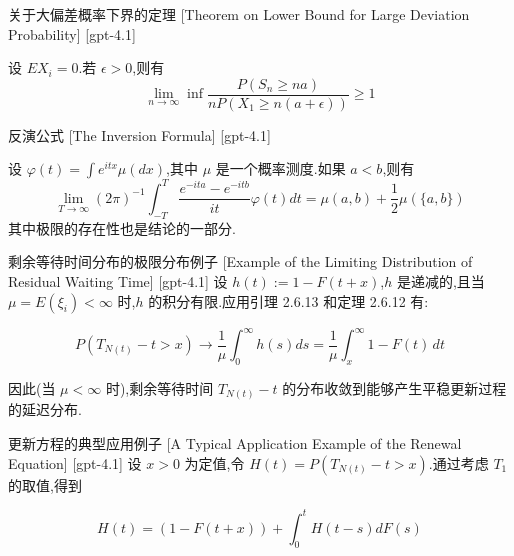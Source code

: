 \documentclass[UTF8]{ctexart}
\begin{document}
    
    
    \begin{thm}
        {关于大偏差概率下界的定理}
        [Theorem on Lower Bound for Large Deviation Probability]
        [gpt-4.1]
        
设 $E X_{i} = 0$.若 $\epsilon > 0$,则有
\[
\lim_{n \to \infty} \inf \frac{P(S_{n} \geq n a)}{n P(X_{1} \geq n(a + \epsilon))} \geq 1
\]

    \end{thm}
    
    
    
    \begin{thm}
        {反演公式}
        [The Inversion Formula]
        [gpt-4.1]
        
设 $\varphi(t) = \int e^{i t x} \mu(dx)$,其中 $\mu$ 是一个概率测度.如果 $a < b$,则有
\[
\lim_{T \to \infty} (2\pi)^{-1} \int_{-T}^{T} \frac{e^{-i t a} - e^{-i t b}}{i t} \varphi(t) dt = \mu(a, b) + \frac{1}{2} \mu(\{a, b\})
\]
其中极限的存在性也是结论的一部分.

    \end{thm}
    
    
    
    \begin{xmp}
        {剩余等待时间分布的极限分布例子}
        [Example of the Limiting Distribution of Residual Waiting Time]
        [gpt-4.1]
        设 $h(t) := 1 - F(t + x)$,$h$ 是递减的,且当 $\mu = E(\xi_{i}) < \infty$ 时,$h$ 的积分有限.应用引理 2.6.13 和定理 2.6.12 有:

\[
P(T_{N(t)} - t > x) \to \frac{1}{\mu} \int_{0}^{\infty} h(s) ds = \frac{1}{\mu} \int_{x}^{\infty} 1 - F(t)\, dt
\]

因此(当 $\mu < \infty$ 时),剩余等待时间 $T_{N(t)} - t$ 的分布收敛到能够产生平稳更新过程的延迟分布.
    \end{xmp}
    
    
    
    \begin{xmp}
        {更新方程的典型应用例子}
        [A Typical Application Example of the Renewal Equation]
        [gpt-4.1]
        设 $x > 0$ 为定值,令 $H ( t ) = P ( T _ { N ( t ) } - t > x )$.通过考虑 $T _ { 1 }$ 的取值,得到

\[
H ( t ) = ( 1 - F ( t + x ) ) + \int _ { 0 } ^ { t } H ( t - s ) d F ( s )
\]

    \end{xmp}
    
\end{document}
